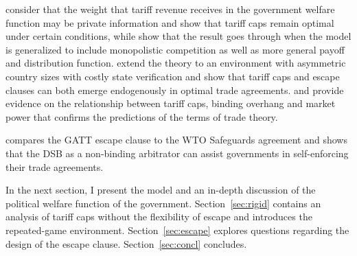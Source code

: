 \Textcite{ab2012} consider that the weight that tariff revenue receives in the government welfare function may be private information and show that tariff caps remain optimal under certain conditions, while \Textcite{ab2013} show that the result goes through when the \Textcite{bs2005} model is generalized to include monopolistic competition as well as more general payoff and distribution function. \Textcite{bb} extend the theory to an environment with asymmetric country sizes with costly state verification and show that tariff caps and escape clauses can both emerge endogenously in optimal trade agreements. \Textcite{bbr} and \Textcite{nos} provide evidence on the relationship between tariff caps, binding overhang and market power that confirms the predictions of the terms of trade theory.

		
\Textcite{beshkar2010b} compares the GATT escape clause to the WTO Safeguards agreement and shows that the DSB as a non-binding arbitrator can assist governments in self-enforcing their trade agreements.



In the next section, I present the model and an in-depth discussion of the political welfare function of the government. Section~\ref{sec:rigid} contains an analysis of tariff caps without the flexibility of escape and introduces the repeated-game environment. Section~\ref{sec:escape} explores questions regarding the design of the escape clause. Section~\ref{sec:concl} concludes.